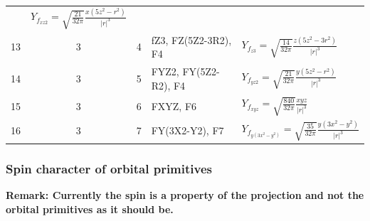 \documentclass[final,12pt]{article}
\begin{document}
{{{{{{\begin{table}[!hbt]
\begin{center}
\begin{tabular}{|r|c|c|l|l|}
   & $Y_{f_{xz2}}=\sqrt{\frac{21}{32\pi}} \frac{x(5z^2-r^2)}{|r|^3}$\\
13 & 3 & 4 & fZ3, FZ(5Z2-3R2), F4
   & $Y_{f_{z3}}=\sqrt{\frac{14}{32\pi}} \frac{z(5z^2-3r^2)}{|r|^3}$\\
14 & 3 & 5 & FYZ2, FY(5Z2-R2), F4
   & $Y_{f_{yz2}}=\sqrt{\frac{21}{32\pi}} \frac{y(5z^2-r^2)}{|r|^3}$\\
15 & 3 & 6 & FXYZ, F6
   & $Y_{f_{xyz}}=\sqrt{\frac{840}{32\pi}} \frac{xyz}{|r|^3}$\\
16 & 3 & 7 & FY(3X2-Y2), F7
   & $Y_{f_{y(3x^2-y^2)}}=\sqrt{\frac{35}{32\pi}} \frac{y(3x^2-y^2)}{|r|^3}$\\
\hline
\end{tabular}
\end{center}
\end{table}


\subsubsection{Spin character of orbital primitives}

\textbf{Remark: Currently the spin is a property of the projection and
  not the orbital primitives as it should be.}

}}}}}}
\end{document}
